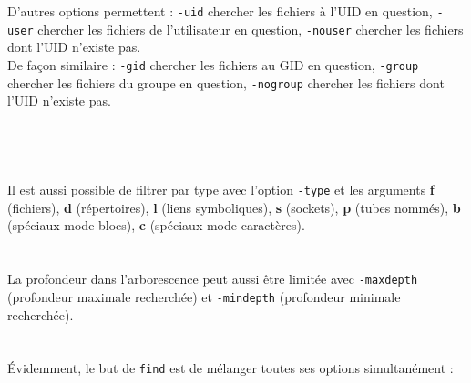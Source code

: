\\
\\
\\
\\
\\

D'autres options permettent : \texttt{-uid} chercher les fichiers à l'UID en question, \texttt{-user} chercher les fichiers de l'utilisateur en question, \texttt{-nouser} chercher les fichiers dont l'UID n'existe pas.\\
De façon similaire : \texttt{-gid} chercher les fichiers au GID en question, \texttt{-group} chercher les fichiers du groupe en question, \texttt{-nogroup} chercher les fichiers dont l'UID n'existe pas.\\

\\
\\
\\
\\

Il est aussi possible de filtrer par type avec l'option \texttt{-type} et les arguments \textbf{f} (fichiers), \textbf{d} (répertoires), \textbf{l} (liens symboliques), \textbf{s} (sockets), \textbf{p} (tubes nommés), \textbf{b} (spéciaux mode blocs), \textbf{c} (spéciaux mode caractères).\\

\\
\\

La profondeur dans l'arborescence peut aussi être limitée avec \texttt{-maxdepth} (profondeur maximale recherchée) et \texttt{-mindepth} (profondeur minimale recherchée).\\

\\
\\

\'Evidemment, le but de \texttt{find} est de mélanger toutes ses options simultanément :\\

\\

\bigskip

